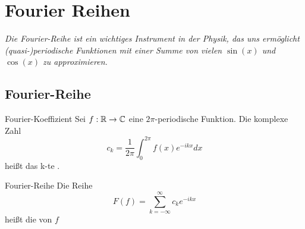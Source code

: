 \newpage
\section[Fourier Reihen]{Fourier Reihen}
\textit{Die Fourier-Reihe ist ein wichtiges Instrument in der Physik, das uns ermöglicht (quasi-)periodische Funktionen mit einer Summe von vielen $\sin(x)$ und $\cos(x)$ zu approximieren.}
\subsection{Fourier-Reihe}\label{ssec:Fourier}


\begin{Def}{Fourier-Koeffizient}
Sei $f:\mathbb{R} \rightarrow \mathbb{C}$ eine $2\pi$-periodische Funktion. Die komplexe Zahl
$$c_k=\frac{1}{2\pi}\int_0^{2\pi}f(x)e^{-ikx}dx$$
heißt das k-te .
\end{Def}
\begin{Def}{Fourier-Reihe}
Die Reihe $$F(f)=\sum_{k=-\infty}^\infty c_ke^{-ikx}$$ heißt die  von $f$
\end{Def}

